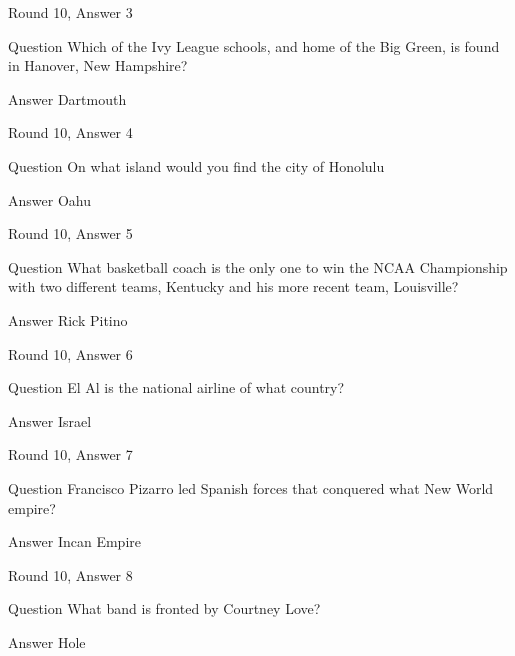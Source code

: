 \documentclass[11pt]{beamer}
\begin{document}
\begin{frame}{Round 10, Answer 3}
\begin{block}{Question}
Which of the Ivy League schools, and home of the Big Green, is found in Hanover, New Hampshire\@?
\end{block}
\pause{}
\begin{block}{Answer}
Dartmouth
\end{block}
\end{frame}
    

\begin{frame}{Round 10, Answer 4}
\begin{block}{Question}
On what island would you find the city of Honolulu
\end{block}
\pause{}
\begin{block}{Answer}
Oahu
\end{block}
\end{frame}
    

\begin{frame}{Round 10, Answer 5}
\begin{block}{Question}
What basketball coach is the only one to win the NCAA Championship with two different teams, Kentucky and his more recent team, Louisville\@?
\end{block}
\pause{}
\begin{block}{Answer}
Rick Pitino
\end{block}
\end{frame}
    

\begin{frame}{Round 10, Answer 6}
\begin{block}{Question}
El Al is the national airline of what country\@?
\end{block}
\pause{}
\begin{block}{Answer}
Israel
\end{block}
\end{frame}
    

\begin{frame}{Round 10, Answer 7}
\begin{block}{Question}
Francisco Pizarro led Spanish forces that conquered what New World empire\@?
\end{block}
\pause{}
\begin{block}{Answer}
Incan Empire
\end{block}
\end{frame}
    

\begin{frame}{Round 10, Answer 8}
\begin{block}{Question}
What band is fronted by Courtney Love\@?
\end{block}
\pause{}
\begin{block}{Answer}
Hole
\end{block}
\end{frame}
    
\end{document}
